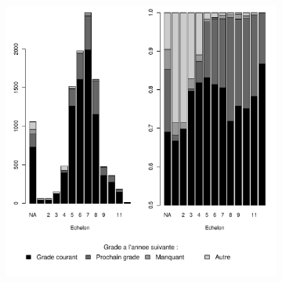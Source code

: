 \documentclass[11pt,a4paper]{article}
\begin{document}
\begin{figure}[ht]
\begin{subfigure}[b]{0.5\linewidth}
    \includegraphics[width=1\linewidth]{AT_hazard_by_ech_794.pdf} 
  \end{subfigure} 
\end{figure}
\end{document}
